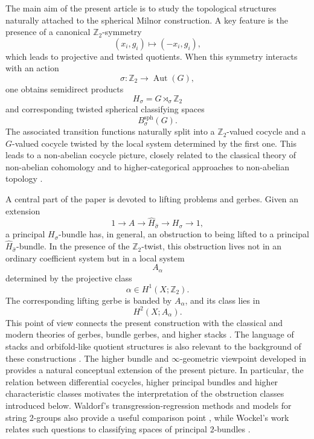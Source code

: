 \documentclass[11pt]{amsart}
\begin{document}
The main aim of the present article is to study the topological structures
naturally attached to the spherical Milnor construction. A key feature is the
presence of a canonical \(\mathbb Z_2\)-symmetry
\[
(x_i,g_i)\mapsto (-x_i,g_i),
\]
which leads to projective and twisted quotients. When this symmetry interacts
with an action
\[
\sigma:\mathbb Z_2\to \operatorname{Aut}(G),
\]
one obtains semidirect products
\[
H_\sigma=G\rtimes_\sigma\mathbb Z_2
\]
and corresponding twisted spherical classifying spaces
\[
B^{\mathrm{sph}}_\sigma(G).
\]
The associated transition functions naturally split into a
\(\mathbb Z_2\)-valued cocycle and a \(G\)-valued cocycle twisted by the local
system determined by the first one. This leads to a non-abelian cocycle
picture, closely related to the classical theory of non-abelian cohomology
\cite{Giraud1971} and to higher-categorical approaches to non-abelian
topology \cite{BrownHiggins1981,BrownHigginsSivera2011,BaezLauda2004}.

A central part of the paper is devoted to lifting problems and gerbes. Given
an extension
\[
1\to A\to \widehat H_{\widehat\sigma}\to H_\sigma\to 1,
\]
a principal \(H_\sigma\)-bundle has, in general, an obstruction to being lifted
to a principal \(\widehat H_{\widehat\sigma}\)-bundle. In the presence of the
\(\mathbb Z_2\)-twist, this obstruction lives not in an ordinary coefficient
system but in a local system
\[
A_\alpha
\]
determined by the projective class
\[
\alpha\in H^1(X;\mathbb Z_2).
\]
The corresponding lifting gerbe is banded by \(A_\alpha\), and its class lies
in
\[
H^2(X;A_\alpha).
\]
This point of view connects the present construction with the classical and
modern theories of gerbes, bundle gerbes, and higher stacks
\cite{Breen1994,Breen2008,BreenMessing2005,Murray1996,Stevenson2000,Waldorf2007,NikolausWaldorf2013}.
The language of stacks and orbifold-like quotient structures is also relevant
to the background of these constructions \cite{MoerdijkPronk1997,Noohi2005,Noohi2012}.
The higher bundle and \(\infty\)-geometric viewpoint developed in
\cite{NikolausSchreiberStevenson2012,Schreiber2013,FiorenzaSchreiberStasheff2007}
provides a natural conceptual extension of the present picture. In particular,
the relation between differential cocycles, higher principal bundles and
higher characteristic classes motivates the interpretation of the obstruction
classes introduced below. Waldorf's transgression-regression methods and
models for string \(2\)-groups also provide a useful comparison point
\cite{Waldorf2010}, while Wockel's work relates such questions to classifying
spaces of principal \(2\)-bundles \cite{Wockel2008}.
\end{document}
